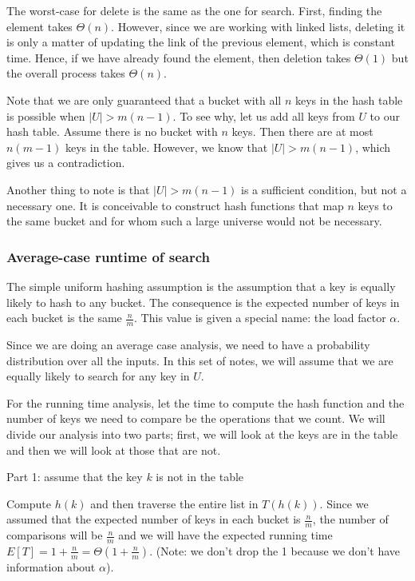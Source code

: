 \documentclass[11pt]{article}
\begin{document}
The worst-case for delete is the same as the one for search. First, finding the element takes $\Theta(n)$. However, since we are working with linked lists, deleting it is only a matter of updating the link of the previous element, which is constant time. Hence, if we have already found the element, then deletion takes $\Theta(1)$ but the overall process takes $\Theta(n)$. 

Note that we are only guaranteed that a bucket with all $n$ keys in the hash table is possible when $|U| > m(n-1)$. To see why, let us add all keys from $U$ to our hash table. Assume there is no bucket with $n$ keys. Then there are at most $n(m-1)$ keys in the table. However, we know that $|U|>m(n-1)$, which gives us a contradiction. 

Another thing to note is that $|U| > m(n-1)$ is a sufficient condition, but not a necessary one. It is conceivable to construct hash functions that map $n$ keys to the same bucket and for whom such a large universe would not be necessary. 

\subsubsection{Average-case runtime of search}
The simple uniform hashing assumption is the assumption that a key is equally likely to hash to any bucket. The consequence is the expected number of keys in each bucket is the same $\frac{n}{m}$. This value is given a special name: the load factor $\alpha$. 

Since we are doing an average case analysis, we need to have a probability distribution over all the inputs. In this set of notes, we will assume that we are equally likely to search for any key in $U$.

For the running time analysis, let the time to compute the hash function and the number of keys we need to compare be the operations that we count. We will divide our analysis into two parts; first, we will look at the keys are in the table and then we will look at those that are not. 

Part 1: assume that the key $k$ is not in the table 

Compute $h(k)$ and then traverse the entire list in $T(h(k))$. Since we assumed that the expected number of keys in each bucket is $\frac{n}{m}$, the number of comparisons will be $\frac{n}{m}$ and we will have the expected running time $E[T] = 1 + \frac{n}{m} = \Theta(1 + \frac{n}{m})$. (Note: we don't drop the 1 because we don't have information about $\alpha$). 
\end{document}
